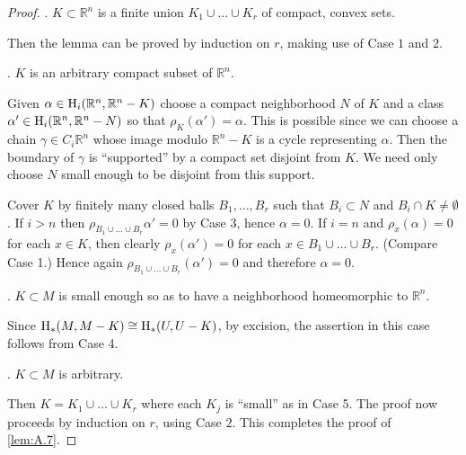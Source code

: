 \documentclass[../main]{subfiles}
\begin{document}
\begin{proof}
. $K \subset {\mathbb R}^n$ is a finite union $K_1 \cup \ldots \cup K_r$ of compact, convex sets. 

Then the lemma can be proved by induction on $r$, making use of Case $1$ and $2$. 

. $K$ is an arbitrary compact subset of ${\mathbb R}^n$. 

Given $\alpha \in \operatorname{H}_i({\mathbb R}^n, {\mathbb R}^n - K)$ choose a compact neighborhood $N$ of $K$ and a class $\alpha' \in \operatorname{H}_i({\mathbb R}^n, {\mathbb R}^n - N)$ so that $\rho_K(\alpha') = \alpha$. This is possible since we can choose a chain $\gamma \in C_i {\mathbb R}^n$ whose image modulo ${\mathbb R}^n - K$ is a cycle representing $\alpha$. Then the boundary of $\gamma$ is ``supported'' by a compact set disjoint from $K$. We need only choose $N$ small enough to be disjoint from this support.

Cover $K$ by finitely many closed balls $B_1, \ldots, B_r$ such that $B_i \subset N$ and $B_i \cap K \ne \emptyset$. If $i > n$ then $\rho_{B_1 \cup \ldots \cup B_r} \alpha' = 0$ by Case 3, hence $\alpha = 0$. If $i = n$ and $\rho_x(\alpha) = 0$ for each $x \in K$, then clearly $\rho_x(\alpha') = 0$ for each $x \in B_1 \cup \ldots \cup B_r$. (Compare Case 1.) Hence again $\rho_{B_1 \cup \ldots \cup B_r} (\alpha') = 0$ and therefore $\alpha = 0$. 

. $K \subset M$ is small enough so as to have a neighborhood homeomorphic to ${\mathbb R}^n$. 

Since $\operatorname{H}_\ast(M, M - K) \cong \operatorname{H}_\ast(U, U - K)$, by excision, the assertion in this case follows from Case 4.

. $K \subset M$ is arbitrary.

Then $K = K_1 \cup \ldots \cup K_r$ where each $K_j$ is ``small'' as in Case 5. The proof now proceeds by induction on $r$, using Case $2$. This completes the proof of \ref{lem:A.7}.
\end{proof}
\end{document}
